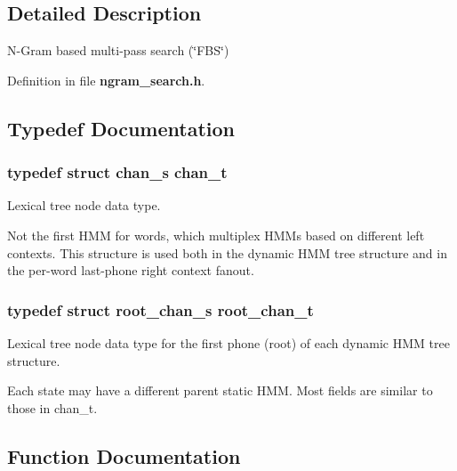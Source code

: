\subsection{Detailed Description}
N-\/\-Gram based multi-\/pass search (\char`\"{}\-F\-B\-S\char`\"{}) 

Definition in file {\bf ngram\-\_\-search.\-h}.



\subsection{Typedef Documentation}
\subsubsection[{chan\-\_\-t}]{\setlength{\rightskip}{0pt plus 5cm}typedef struct {\bf chan\-\_\-s}  {\bf chan\-\_\-t}}\label{ngram__search_8h_a2c5740fe4792d870b73f4100b32e9324}


Lexical tree node data type. 

Not the first H\-M\-M for words, which multiplex H\-M\-Ms based on different left contexts. This structure is used both in the dynamic H\-M\-M tree structure and in the per-\/word last-\/phone right context fanout. 
\subsubsection[{root\-\_\-chan\-\_\-t}]{\setlength{\rightskip}{0pt plus 5cm}typedef struct {\bf root\-\_\-chan\-\_\-s}  {\bf root\-\_\-chan\-\_\-t}}\label{ngram__search_8h_aab8eee3f73f666d0e12c5b355a651cff}


Lexical tree node data type for the first phone (root) of each dynamic H\-M\-M tree structure. 

Each state may have a different parent static H\-M\-M. Most fields are similar to those in chan\-\_\-t. 

\subsection{Function Documentation}
